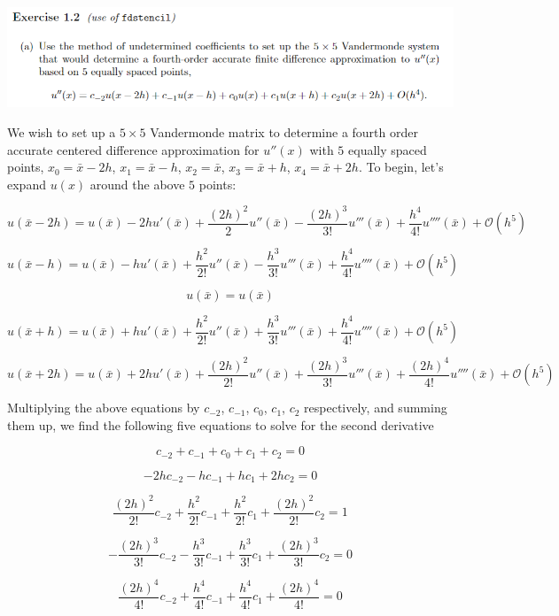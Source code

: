 \documentclass{article}
\begin{document}
\includegraphics[scale = 0.8]{ex1.2a.PNG}
\newline

We wish to set up a $5 \times 5$ Vandermonde matrix to determine a fourth order accurate centered difference approximation for $u''(x)$ with $5$ equally spaced points, $x_0 = \bar{x} - 2h$, $x_1 = \bar{x} - h$, $x_2 = \bar{x}$, $x_3 = \bar{x} + h$, $x_4 = \bar{x} + 2h$. To begin, let's expand $u(x)$ around the above $5$ points:

\[u(\bar{x} - 2h) = u(\bar{x}) - 2hu'(\bar{x}) + \frac{(2h)^2}{2}u''(\bar{x}) - \frac{(2h)^3}{3!}u'''(\bar{x}) + \frac{h^4}{4!}u''''(\bar{x})  + \mathcal{O}(h^5)\]

\[u(\bar{x} - h) = u(\bar{x}) -hu'(\bar{x}) + \frac{h^2}{2!}u''(\bar{x}) - \frac{h^3}{3!}u'''(\bar{x}) + \frac{h^4}{4!}u''''(\bar{x}) + \mathcal{O}(h^5)\]

\[u(\bar{x}) = u(\bar{x})\]

\[u(\bar{x} + h) = u(\bar{x}) + hu'(\bar{x}) + \frac{h^2}{2!}u''(\bar{x}) + \frac{h^3}{3!}u'''(\bar{x}) + \frac{h^4}{4!}u''''(\bar{x}) + \mathcal{O}(h^5)\]

\[u(\bar{x} + 2h) = u(\bar{x}) + 2hu'(\bar{x}) + \frac{(2h)^2}{2!}u''(\bar{x}) + \frac{(2h)^3}{3!}u'''(\bar{x}) + \frac{(2h)^4}{4!}u''''(\bar{x}) + \mathcal{O}(h^5)\]

Multiplying the above equations by $c_{-2}$, $c_{-1}$, $c_0$, $c_1$, $c_2$ respectively, and summing them up, we find the following five equations to solve for the second derivative

\[c_{-2} + c_{-1} + c_0 + c_1 + c_2 = 0\]

\[-2hc_{-2} - hc_{-1} + hc_1 + 2hc_2 = 0\]

\[\frac{(2h)^2}{2!}c_{-2} + \frac{h^2}{2!}c_{-1} + \frac{h^2}{2!}c_1 + \frac{(2h)^2}{2!}c_2 = 1\]

\[-\frac{(2h)^3}{3!}c_{-2} - \frac{h^3}{3!}c_{-1} + \frac{h^3}{3!}c_1 + \frac{(2h)^3}{3!}c_2 = 0\]

\[\frac{(2h)^4}{4!}c_{-2} + \frac{h^4}{4!}c_{-1} + \frac{h^4}{4!}c_1 + \frac{(2h)^4}{4!} = 0\]
\end{document}
